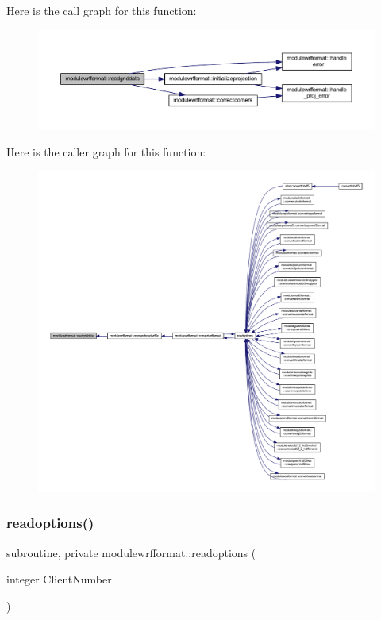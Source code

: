 Here is the call graph for this function\+:\nopagebreak
\begin{figure}[H]
\begin{center}
\leavevmode
\includegraphics[width=350pt]{namespacemodulewrfformat_a0a9c15502f5f361afd382196884a739d_cgraph}
\end{center}
\end{figure}
Here is the caller graph for this function\+:\nopagebreak
\begin{figure}[H]
\begin{center}
\leavevmode
\includegraphics[width=350pt]{namespacemodulewrfformat_a0a9c15502f5f361afd382196884a739d_icgraph}
\end{center}
\end{figure}
\mbox{\label{namespacemodulewrfformat_a00bbd242b402a9ccd03ef1e1f7c2721e}} 
\subsubsection{\texorpdfstring{readoptions()}{readoptions()}}
{\footnotesize\ttfamily subroutine, private modulewrfformat\+::readoptions (\begin{DoxyParamCaption}\item[{integer}]{Client\+Number }\end{DoxyParamCaption})\hspace{0.3cm}{\ttfamily [private]}}

